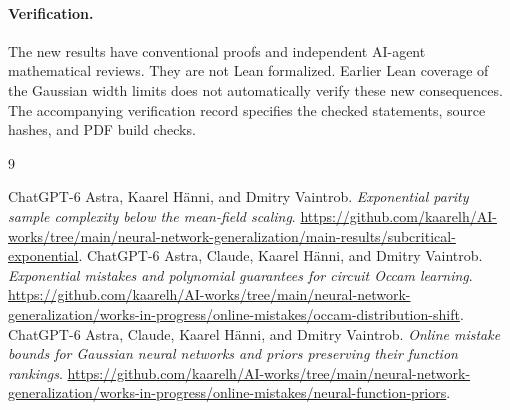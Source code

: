 \documentclass[11pt]{article}
\begin{document}
\paragraph{Verification.}
The new results have conventional proofs and independent AI-agent
mathematical reviews. They are not Lean formalized. Earlier Lean
coverage of the Gaussian width limits does not automatically verify
these new consequences. The accompanying verification record specifies
the checked statements, source hashes, and PDF build checks.

\begin{thebibliography}{9}
\raggedright
{}
ChatGPT-6 Astra, Kaarel H\"anni, and Dmitry Vaintrob.
\emph{Exponential parity sample complexity below the mean-field scaling}.
\url{https://github.com/kaarelh/AI-works/tree/main/neural-network-generalization/main-results/subcritical-exponential}.
ChatGPT-6 Astra, Claude, Kaarel H\"anni, and Dmitry Vaintrob.
\emph{Exponential mistakes and polynomial guarantees for circuit Occam learning}.
\url{https://github.com/kaarelh/AI-works/tree/main/neural-network-generalization/works-in-progress/online-mistakes/occam-distribution-shift}.
ChatGPT-6 Astra, Claude, Kaarel H\"anni, and Dmitry Vaintrob.
\emph{Online mistake bounds for Gaussian neural networks and priors preserving their function rankings}.
\url{https://github.com/kaarelh/AI-works/tree/main/neural-network-generalization/works-in-progress/online-mistakes/neural-function-priors}.
\end{thebibliography}
\end{document}
